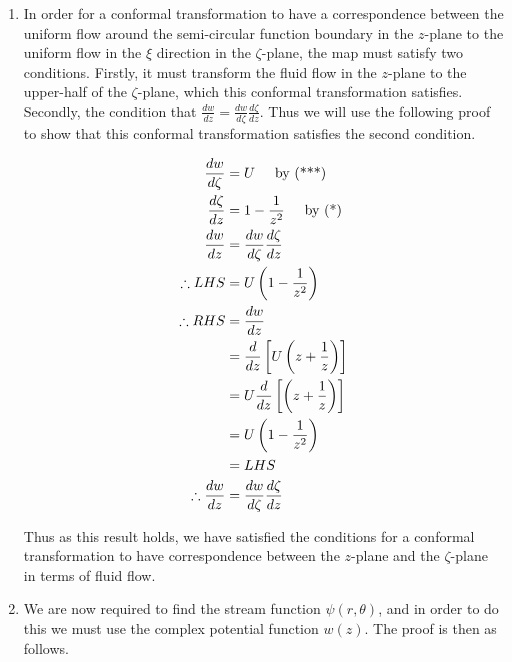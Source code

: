 \documentclass[a4paper]{article}
\begin{document}
\begin{enumerate}[label=\textbf{\arabic*.}]
\begin{enumerate}
\begin{enumerate}
			\bigbreak

			\item In order for a conformal transformation to have a correspondence between the uniform flow around the semi-circular function boundary in the $\displaystyle{z}$-plane to the uniform flow in the $\displaystyle{\xi}$ direction in the $\displaystyle{\zeta}$-plane, the map must satisfy two conditions. Firstly, it must transform the fluid flow in the $\displaystyle{z}$-plane to the upper-half of the $\displaystyle{\zeta}$-plane, which this conformal transformation satisfies. Secondly, the condition that $\displaystyle{\frac{dw}{dz} = \frac{dw}{d\zeta} \frac{d\zeta}{dz}}$. Thus we will use the following proof to show that this conformal transformation satisfies the second condition.

			\begin{align*}
			\frac{dw}{d\zeta} & = U \hspace{5mm} \text{by (***)}\\
			\frac{d\zeta}{dz} & = 1 - \frac{1}{z^2} \hspace{5mm} \text{by (*)}\\
			\frac{dw}{dz} & = \frac{dw}{d\zeta} \frac{d\zeta}{dz}\\
			\therefore LHS & = U\left(1 - \frac{1}{z^2}\right)\\
			\therefore RHS & = \frac{dw}{dz}\\
			& = \frac{d}{dz}\left[U\left(z + \frac{1}{z}\right)\right]\\
			& = U\frac{d}{dz}\left[\left(z + \frac{1}{z}\right)\right]\\
			& = U\left(1 - \frac{1}{z^2}\right)\\
			& = LHS\\
			\therefore \frac{dw}{dz} & = \frac{dw}{d\zeta} \frac{d\zeta}{dz}\\
			\end{align*}

			Thus as this result holds, we have satisfied the conditions for a conformal transformation to have correspondence between the $\displaystyle{z}$-plane and the $\displaystyle{\zeta}$-plane in terms of fluid flow.

			\bigbreak
 
			\item We are now required to find the stream function $\displaystyle{\psi(r,\theta)}$, and in order to do this we must use the complex potential function $\displaystyle{w(z)}$. The proof is then as follows.


\end{enumerate}
\end{enumerate}
\end{enumerate}
\end{document}
